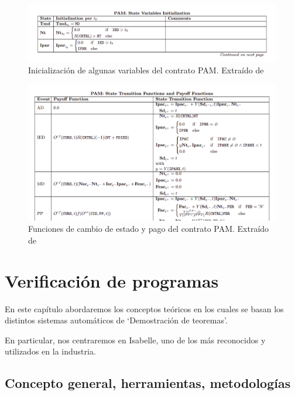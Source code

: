 \documentclass[12pt]{book}
\begin{document}
\begin{figure}
    \centering
    \includegraphics[width=\textwidth]{PAM_State_Variables_Initialization.png}
    \caption{Inicialización de algunas variables del contrato PAM. Extraído de~\cite{ACTUS_Techspecs}}\label{fig:PAM_State_Variables_Initialization}
\end{figure}

\begin{figure}
    \centering
    \includegraphics[width=\textwidth]{PAM_STF_POF.png}
    \caption{Funciones de cambio de estado y pago del contrato PAM. Extraído de~\cite{ACTUS_Techspecs}}\label{fig:PAM_STF_POF}
\end{figure}



\chapter{Verificación de programas}

En este capítulo abordaremos los conceptos teóricos en los cuales se basan los distintos sistemas automáticos de `Demostración de teoremas'.

En particular, nos centraremos en Isabelle, uno de los más reconocidos y utilizados en la industria. 

\section{Concepto general, herramientas, metodologías}
\end{document}
